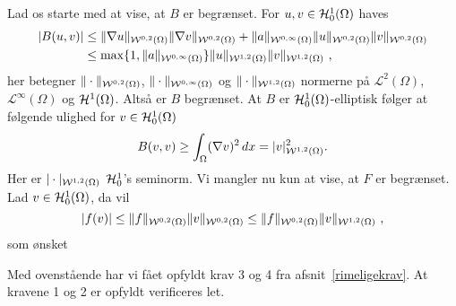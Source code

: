 \begin{example}
Lad os starte med at vise, at $B$ er begrænset. For
$u,v\in\mathcal H^1_0(\Omega)$ haves
\begin{align}
  |B(u,v)| &\leq \|\nabla u\|_{{\mathcal W}^{0,2}(\Omega)}\|\nabla v\|_{{\mathcal W}^{0,2}(\Omega)} + 
    \|a\|_{{\mathcal W}^{0,\infty}(\Omega)} \|u\|_{{\mathcal W}^{0,2}(\Omega)}\|v\|_{{\mathcal W}^{0,2}(\Omega)} \\
  &\leq \max \{ 1,\|a\|_{{\mathcal W}^{0,\infty}(\Omega)} \} 
    \|u\|_{{\mathcal W}^{1,2}(\Omega)}\|v\|_{{\mathcal W}^{1,2}(\Omega)}\ , \notag
\end{align} 
her betegner $\|\cdot\|_{{\mathcal W}^{0,2}(\Omega)}$, $\|\cdot\|_{{\mathcal W}^{0,\infty}(\Omega)}$ og
$\|\cdot\|_{{\mathcal W}^{1,2}(\Omega)}$ normerne på ${\mathcal L}^2(\Omega)$,
${\mathcal L}^\infty(\Omega)$ og $\mathcal H^1(\Omega)$. Altså er $B$
begrænset. At $B$ er $\mathcal H^1_0(\Omega)$-elliptisk følger at følgende
ulighed for $v\in\mathcal H^1_0(\Omega)$
\begin{equation}
  B(v,v) \geq \int_\Omega (\nabla v)^2\, dx = |v|_{{\mathcal W}^{1,2}(\Omega)}^2.
\end{equation}
Her er $|\cdot|_{{\mathcal W}^{1,2}(\Omega)}$ $\mathcal H^1_0$'s seminorm. Vi mangler nu kun at
vise, at $F$ er begrænset. Lad $v\in\mathcal H^1_0(\Omega)$, da vil
\begin{equation}
  |f(v)| \leq \|f\|_{{\mathcal W}^{0,2}(\Omega)} \|v\|_{{\mathcal W}^{0,2}(\Omega)} 
    \leq \|f\|_{{\mathcal W}^{0,2}(\Omega)} \|v\|_{{\mathcal W}^{1,2}(\Omega)}\ , 
\end{equation}
som ønsket

Med ovenstående har vi fået opfyldt krav 3 og 4 fra afsnit~\ref{rimeligekrav}. At
kravene 1 og 2 er opfyldt verificeres let.
\end{example}